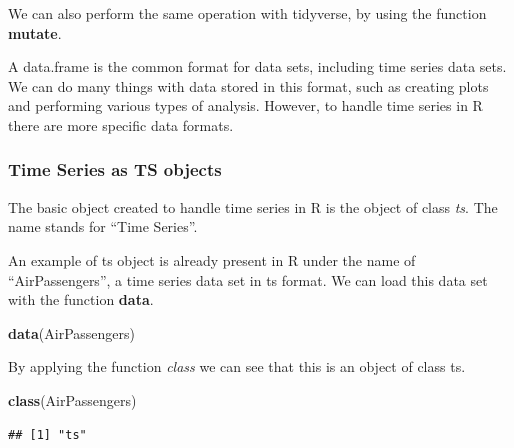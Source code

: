 \documentclass[
]{article}
\newenvironment{Shaded}{\begin{snugshade}}{\end{snugshade}}
\newcommand{\DataTypeTok}[1]{\textcolor[rgb]{0.13,0.29,0.53}{#1}}
\newcommand{\KeywordTok}[1]{\textcolor[rgb]{0.13,0.29,0.53}{\textbf{#1}}}
\newcommand{\NormalTok}[1]{#1}
\newcommand{\OperatorTok}[1]{\textcolor[rgb]{0.81,0.36,0.00}{\textbf{#1}}}
\newcommand{\StringTok}[1]{\textcolor[rgb]{0.31,0.60,0.02}{#1}}
\begin{document}
We can also perform the same operation with tidyverse, by using the function \textbf{mutate}.

\begin{Shaded}
\end{Shaded}

A data.frame is the common format for data sets, including time series data sets. We can do many things with data stored in this format, such as creating plots and performing various types of analysis. However, to handle time series in R there are more specific data formats.

\hypertarget{time-series-as-ts-objects}{%
\subsubsection{Time Series as TS objects}\label{time-series-as-ts-objects}}

The basic object created to handle time series in R is the object of class \emph{ts}. The name stands for ``Time Series''.

An example of ts object is already present in R under the name of ``AirPassengers'', a time series data set in ts format. We can load this data set with the function \textbf{data}.

\begin{Shaded}
\begin{Highlighting}[]
\KeywordTok{data}\NormalTok{(AirPassengers)}
\end{Highlighting}
\end{Shaded}

By applying the function \emph{class} we can see that this is an object of class ts.

\begin{Shaded}
\begin{Highlighting}[]
\KeywordTok{class}\NormalTok{(AirPassengers)}
\end{Highlighting}
\end{Shaded}

\begin{verbatim}
## [1] "ts"
\end{verbatim}
\end{document}
